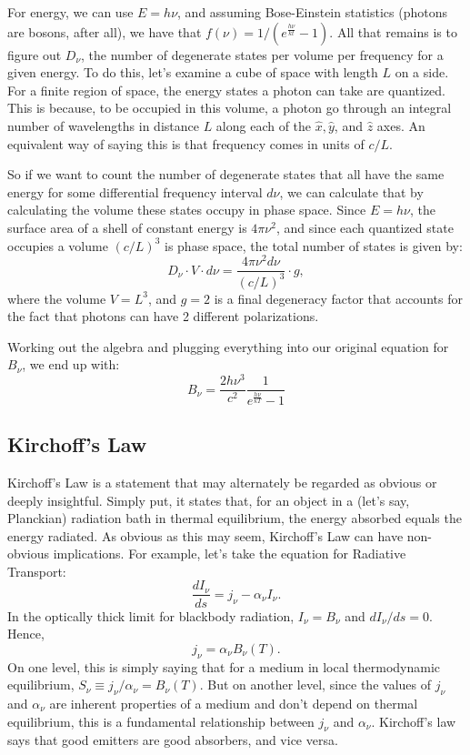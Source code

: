 \documentclass{article}
\begin{document}
For energy, we can use $E=h\nu$, and assuming Bose-Einstein statistics (photons are bosons, after all), we have that $f(\nu)= 1/(e^\frac{h\nu}{kt}-1)$.
All that remains is to figure out $D_\nu$, the number of degenerate states per volume per frequency for a given energy.  To do this, let's
examine a cube of space with length $L$ on a side.  For a finite region of space, the energy states a photon can take are quantized.  This is because, to be occupied in this volume, a photon go through an integral number of wavelengths in distance $L$ along each of the $\hat x, \hat y$, and $\hat z$ axes.  An equivalent way of saying this is that frequency comes in units of $c/L$.  

So if we want to count the number of degenerate states that all have the same energy for some differential frequency interval $d\nu$, we can calculate
that by calculating the volume these states occupy in phase space.  Since $E=h\nu$, the surface area of a shell of constant energy is $4\pi\nu^2$,
and since each quantized state occupies a volume $(c/L)^3$ is phase space, the total number of states is given by:
\begin{equation}
D_\nu\cdot V\cdot d\nu= \frac{4\pi\nu^2d\nu}{(c/L)^3}\cdot g,
\end{equation}
where the volume $V=L^3$, and $g=2$ is a final degeneracy factor that accounts for the fact that photons can have 2 different polarizations.

Working out the algebra and plugging everything into our original equation for $B_\nu$, we end up with:
\begin{equation}
B_\nu = \frac{2h\nu^3}{c^2}\frac1{e^\frac{h\nu}{kT}-1}
\end{equation}

\subsection{Kirchoff's Law}

Kirchoff's Law is a statement that may alternately be regarded as obvious or deeply insightful.  Simply put, it
states that, for an object in a (let's say, Planckian) radiation bath in thermal equilibrium, the energy absorbed
equals the energy radiated.  As obvious as this may seem, Kirchoff's Law can have non-obvious implications.
For example, let's take the equation for Radiative Transport:
\begin{equation}
\frac{dI_\nu}{ds}=j_\nu - \alpha_\nu I_\nu.
\end{equation}
In the optically thick limit for blackbody radiation, $I_\nu=B_\nu$ and $dI_\nu/ds=0$.  Hence,
\begin{equation}
j_\nu=\alpha_\nu B_\nu(T).
\end{equation}
On one level, this is simply saying that for a medium in local thermodynamic equilibrium, $S_\nu\equiv j_\nu/\alpha_\nu = B_\nu(T)$.  But on another level, since the values of $j_\nu$ and $\alpha_\nu$ are inherent properties of a medium and don't depend on thermal equilibrium, this is a fundamental relationship between $j_\nu$ and $\alpha_\nu$.   Kirchoff's law says that good emitters are good absorbers, and vice versa.
\end{document}
